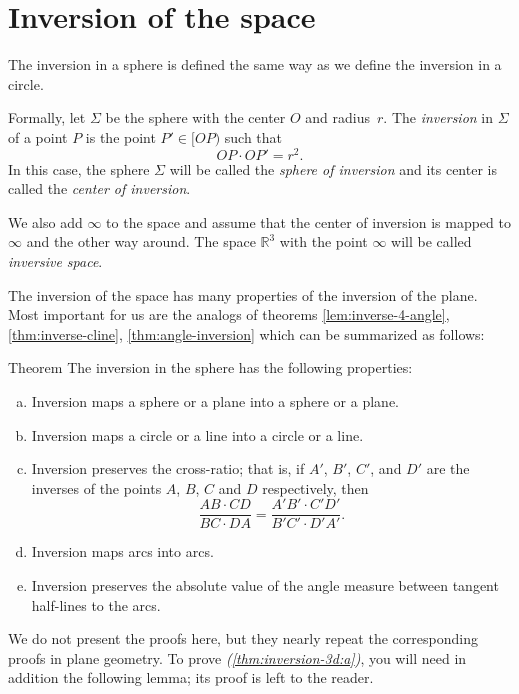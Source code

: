 \section[Inversion]{Inversion of the space}

The inversion in a sphere is defined the same way as we define the inversion in a circle.

Formally, let $\Sigma$ be the sphere with the center $O$ and radius~$r$.
The \emph{inversion} in $\Sigma$ of a point $P$ is the point $P'\in[OP)$ such that
$$OP\cdot OP'=r^2.$$
In this case, the sphere $\Sigma$  will be called the 
\emph{sphere of inversion} 
and its center is called the \emph{center of inversion}.

We also add $\infty$ to the space and assume that the center of inversion is mapped to $\infty$ and the other way around. 
The space $\mathbb{R}^3$ with the point $\infty$ will be called \emph{inversive space}.

The inversion of the space 
has many properties 
of the inversion of the plane.
Most important for us are the analogs of theorems \ref{lem:inverse-4-angle}, \ref{thm:inverse-cline}, \ref{thm:angle-inversion} which can be summarized as follows:

\begin{thm}{Theorem}\label{thm:inversion-3d}
The inversion in the sphere has the following properties:
\begin{enumerate}[(a)]
\item\label{thm:inversion-3d:a} Inversion maps a sphere or a plane into a sphere or a plane.
\item\label{thm:inversion-3d:b} Inversion maps a circle or a line into a circle or a line. 
\item\label{thm:inversion-3d:cross-ratio} Inversion preserves the cross-ratio;
that is, if $A'$, $B'$, $C'$, and $D'$ are the inverses of the points $A$, $B$, $C$ and $D$ respectively,
then
$$\frac{AB\cdot CD}{BC\cdot DA}= \frac{A'B'\cdot C'D'}{B'C'\cdot D'A'}.$$
\item Inversion maps arcs into arcs.
\item\label{thm:inversion-3d:angle} Inversion preserves the absolute value of the angle
measure between tangent half-lines to the arcs.
\end{enumerate}
\end{thm}


We do not present the proofs here, but
they nearly repeat the corresponding proofs in plane geometry.
To prove \textit{(\ref{thm:inversion-3d:a})}, you will need in addition the following lemma;
its proof is left to the reader.

